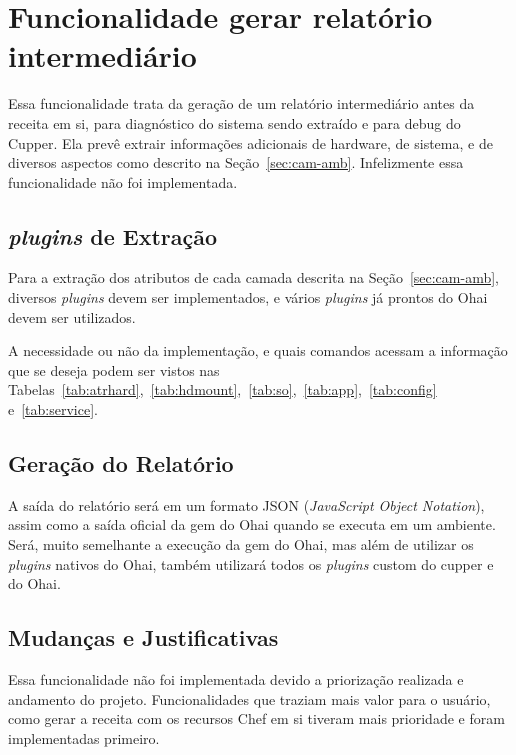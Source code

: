 \section{Funcionalidade gerar relatório intermediário}
\label{sec:rel}


Essa funcionalidade trata da geração de um relatório intermediário antes da 
receita em si, para diagnóstico do sistema sendo extraído e para debug do 
Cupper. Ela prevê extrair informações adicionais de hardware, de sistema, e de
diversos aspectos como descrito na Seção~\ref{sec:cam-amb}. Infelizmente essa
funcionalidade não foi implementada.

\subsection{\textit{plugins} de Extração}
Para a extração dos atributos de cada camada descrita na Seção~\ref{sec:cam-amb},
diversos \textit{plugins} devem ser implementados, e vários \textit{plugins} já prontos do Ohai
devem ser utilizados.

A necessidade ou não da implementação, e quais comandos acessam a informação 
que se deseja podem ser vistos nas Tabelas~\ref{tab:atrhard},~\ref{tab:hdmount},~\ref{tab:so},~\ref{tab:app},~\ref{tab:config} e~\ref{tab:service}.

\subsection{Geração do Relatório}
A saída do relatório será em um formato JSON (\textit{JavaScript Object Notation}),
assim como a saída oficial da gem do Ohai quando se executa em um ambiente. Será,
muito semelhante a execução da gem do Ohai, mas além de utilizar os \textit{plugins} nativos
do Ohai, também utilizará todos os \textit{plugins} custom do cupper e do Ohai.

\subsection{Mudanças e Justificativas}
Essa funcionalidade não foi implementada devido a priorização realizada e andamento
do projeto. Funcionalidades que traziam mais valor para o usuário, como 
gerar a receita com os recursos Chef em si tiveram mais prioridade e foram implementadas
primeiro.
